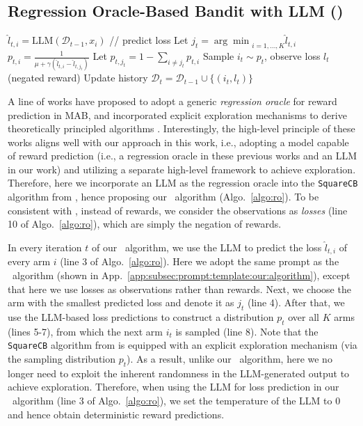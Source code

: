 \subsection{Regression Oracle-Based Bandit with LLM (\algro)}
\label{subsec:algo:ro}
\begin{algorithm}[h]
\begin{algorithmic}[1]
                \STATE $\widehat{l}_{t,i} = \text{LLM}(\mathcal{D}_{t-1}, x_i)$ // predict loss
            \ENDFOR
            \STATE Let $j_t = {\arg\min}_{i=1,\ldots,K}\widehat{l}_{t,i}$
                \STATE $p_{t,i} = \frac{1}{\mu + \gamma (\widehat{l}_{t,i} - \widehat{l}_{t,j_t})}$
            \ENDFOR
            \STATE Let $p_{t,j_t} = 1 - \sum_{i\neq j_t}p_{t,i}$
            \STATE Sample $i_t \sim p_{t}$, observe loss $l_t$ (negated reward)
            \STATE Update history $\mathcal{D}_t = \mathcal{D}_{t-1} \cup \{(i_t,l_t)\}$
        \ENDFOR
\end{algorithmic}
\caption{\algro}
\label{algo:ro}
\end{algorithm}
A line of works have proposed to adopt a generic \emph{regression oracle} for reward prediction in MAB, and incorporated explicit exploration mechanisms to derive theoretically principled algorithms \cite{foster2018practical,foster2020beyond}.
Interestingly, the high-level principle of these works aligns well with our approach in this work, i.e., adopting a model capable of reward prediction (i.e., a regression oracle in these previous works and an LLM in our work) and utilizing a separate high-level framework to achieve exploration.
Therefore, here we incorporate an LLM as the regression oracle into the \texttt{SquareCB} algorithm from \citet{foster2020beyond}, hence proposing our \algro~algorithm (Algo.~\ref{algo:ro}).
To be consistent with \citet{foster2020beyond}, instead of rewards, we consider the observations as \emph{losses} (line 10 of Algo.~\ref{algo:ro}), which are simply the negation of rewards.

In every iteration $t$ of our \algro~algorithm, we use the LLM to predict the loss $\widehat{l}_{t,i}$ of every arm $i$ (line 3 of Algo.~\ref{algo:ro}).
Here we adopt the same prompt as the \algts~algorithm (shown in App.~\ref{app:subsec:prompt:template:our:algorithm}), except that here we use losses as observations rather than rewards.
Next, we choose the arm with the smallest predicted loss and denote it as $j_t$ (line 4).
After that, we use the LLM-based loss predictions to construct a distribution $p_{t}$ over all $K$ arms (lines 5-7), from which the next arm $i_t$ is sampled (line 8).
Note that the \texttt{SquareCB} algorithm from \citet{foster2020beyond} is equipped with an explicit exploration mechanism (via the sampling distribution $p_t$).
As a result, unlike our \algts~algorithm, here we no longer need to exploit the inherent randomness in the LLM-generated output to achieve exploration.
Therefore, when using the LLM for loss prediction in our \algro~algorithm (line 3 of Algo.~\ref{algo:ro}), we set the temperature of the LLM to $0$ and hence obtain deterministic reward predictions.


